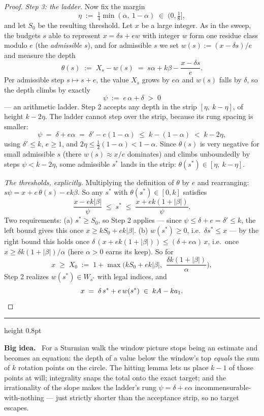 \documentclass[11pt,reqno]{amsart}
\theoremstyle{plain}
\theoremstyle{definition}
\theoremstyle{remark}
\newenvironment{bigidea}
  {\par\medskip\noindent\hspace*{0.02\linewidth}%
   \begin{minipage}{0.96\linewidth}
   {\color{blue!55!black}\hrule height 0.8pt}\vspace{6pt}
   \noindent\textbf{Big idea.}\ }
  {\par\vspace{6pt}{\color{blue!55!black}\hrule height 0.8pt}%
   \end{minipage}\par\medskip}
\begin{document}
\begin{proof}
\smallskip
\emph{Step 3: the ladder.} Now fix the margin
\[
  \eta \;:=\; \tfrac14 \min(\alpha,\ 1 - \alpha) \;\in\; (0, \tfrac18] ,
\]
and let $S_0$ be the resulting threshold. Let $x$ be a large integer. As in the
sweep, the budgets $s$ able to represent $x = \delta s + e w$ with integer $w$ form
one residue class modulo $e$ (the \emph{admissible} $s$), and for admissible $s$ we
set $w(s) := (x - \delta s)/e$ and measure the depth
\[
  \theta(s) \;:=\; X_s - w(s) \;=\; s\alpha + k\beta - \frac{x - \delta s}{e} .
\]
Per admissible step $s \mapsto s + e$, the value $X_s$ grows by $e\alpha$ and
$w(s)$ falls by $\delta$, so the depth climbs by exactly
\[
  \psi \;:=\; e\,\alpha + \delta \;>\; 0
\]
--- an arithmetic ladder. Step 2 accepts any depth in the strip $[\eta,\ k -
\eta]$, of height $k - 2\eta$. The ladder cannot step over the strip, because its
rung spacing is smaller:
\[
  \psi \;=\; \delta + e\alpha \;=\; \delta' - e(1 - \alpha) \;\le\; k - (1 -
  \alpha) \;<\; k - 2\eta ,
\]
using $\delta' \le k$, $e \ge 1$, and $2\eta \le \tfrac12(1-\alpha) < 1 - \alpha$.
Since $\theta(s)$ is very negative for small admissible $s$ (there $w(s) \approx
x/e$ dominates) and climbs unboundedly by steps $\psi < k - 2\eta$, some admissible
$s^*$ lands in the strip: $\theta(s^*) \in [\eta,\ k - \eta]$.

\emph{The thresholds, explicitly.} Multiplying the definition of $\theta$ by $e$
and rearranging: $s\psi = x + e\,\theta(s) - e k \beta$. So any $s^*$ with
$\theta(s^*) \in [0, k]$ satisfies
\[
  \frac{x - e k |\beta|}{\psi} \;\le\; s^* \;\le\; \frac{x + ek(1 + |\beta|)}{\psi}.
\]
Two requirements: (a) $s^* \ge S_0$, so Step 2 applies --- since $\psi \le \delta +
e = \delta' \le k$, the left bound gives this once $x \ge k S_0 + e k |\beta|$.
(b) $w(s^*) \ge 0$, i.e.\ $\delta s^* \le x$ --- by the right bound this holds once
$\delta\,(x + ek(1+|\beta|)) \le (\delta + e\alpha)\,x$, i.e.\ once $x \ge
\delta k (1 + |\beta|)/\alpha$ (here $\alpha > 0$ earns its keep). So for
\[
  x \;\ge\; X_0 \;:=\; 1 + \max\Big( k S_0 + ek|\beta| ,\ \ \frac{\delta k
  (1+|\beta|)}{\alpha} \Big),
\]
Step 2 realizes $w(s^*) \in W_{s^*}$ with legal indices, and
\[
  x \;=\; \delta\,s^* + e\,w(s^*) \;\in\; kA - k a_1 . \qedhere
\]
\end{proof}

\begin{bigidea}
For a Sturmian walk the window picture stops being an estimate and becomes an
equation: the depth of a value below the window's top \emph{equals} the sum of $k$
rotation points on the circle. The hitting lemma lets us place $k-1$ of those
points at will; integrality snaps the total onto the exact target; and the
irrationality of the slope makes the ladder's rung $\psi = \delta + e\alpha$
incommensurable-with-nothing --- just strictly shorter than the acceptance strip,
so no target escapes.
\end{bigidea}
\end{document}
